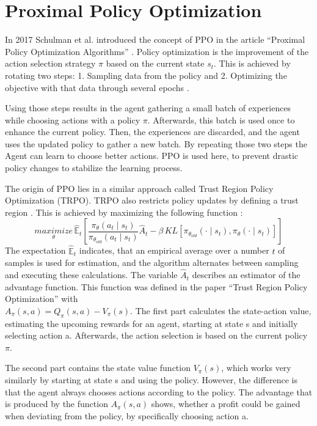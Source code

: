 \section{Proximal Policy Optimization}
In 2017 Schulman et al. introduced the concept of PPO in the article ``Proximal Policy Optimization Algorithms'' \cite{scwo17}.
Policy optimization is the improvement of the action selection strategy $\pi$ based on the current state $s_{t}$. This is achieved by rotating two steps: 1. Sampling data from the policy and 2. Optimizing the objective with that data through several epochs \cite{scwo17}.

Using those steps results in the agent gathering a small batch of experiences while choosing actions with a policy $\pi$. Afterwards, this batch is used once to enhance the current policy. Then, the experiences are discarded, and the agent uses the updated policy to gather a new batch. By repeating those two steps the Agent can learn to choose better actions. PPO is used here, to prevent drastic policy changes to stabilize the learning process.

The origin of PPO lies in a similar approach called Trust Region Policy Optimization (TRPO). TRPO also restricts policy updates by defining a trust region \cite{scle15}. This is achieved by maximizing the following function \cite{scwo17}:
\begin{equation}\label{eq:TRPO}
    \underset{\theta}{maximize}\,\hat{\mathbb{E}}_{t} \left[ \frac{\pi_{\theta}(a_{t} \mid s_{t})}{\pi_{\theta_{old}}(a_{t} \mid s_{t})}
        \hat{A}_{t}-\beta \, KL[\pi_{\theta_{old}}(\cdot \mid s_{t}),\pi_{\theta}(\cdot \mid s_{t})] \right]
\end{equation}
The expectation $\hat{\mathbb{E}}_{t}$ indicates, that an empirical average over a number $t$ of samples is used for estimation, and the algorithm alternates between sampling and executing these calculations. The variable $\hat{A}_{t}$ describes an estimator of the advantage function. This function was defined in the paper ``Trust Region Policy Optimization'' \cite{scle15} with \\ $A_\pi(s,a) = Q_\pi(s,a)-V_\pi(s)$. The first part calculates the state-action value, estimating the upcoming rewards for an agent, starting at state s and initially selecting action a. Afterwards, the action selection is based on the current policy $\pi$. 

The second part contains the state value function $V_\pi(s)$, which works very similarly by starting at state s and using the policy. However, the difference is that the agent always chooses actions according to the policy. The advantage that is produced by the function $A_\pi(s,a)$ shows, whether a profit could be gained when deviating from the policy, by specifically choosing action a.

